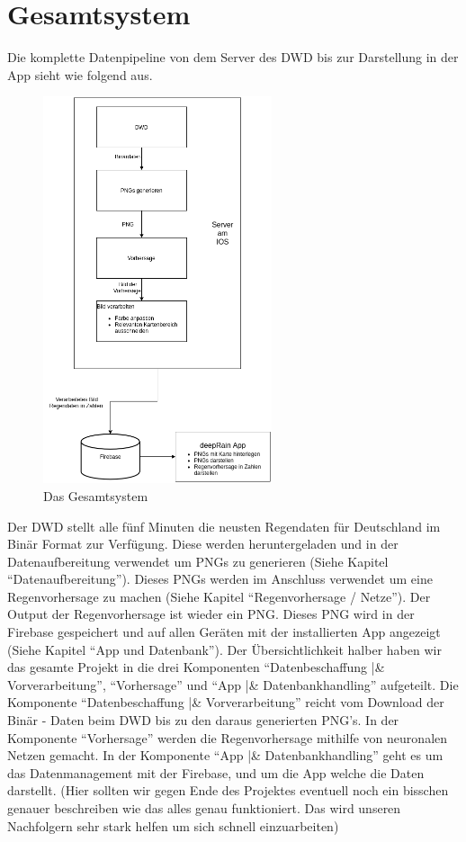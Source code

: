 \section{Gesamtsystem}\label{gesamtsystem}
Die komplette Datenpipeline von dem Server des DWD bis zur Darstellung in der App sieht wie folgend aus.  

\begin{figure}[htb]
 \centering
 \includegraphics[width=0.6\textwidth,angle=0]{abb/Gesamtsystem}
 \caption[Das Gesamtsystem]{Das Gesamtsystem}
\label{fig:Beschreibung}
\end{figure}

Der DWD stellt alle fünf Minuten die neusten Regendaten für Deutschland im Binär Format zur Verfügung. Diese werden heruntergeladen und in der Datenaufbereitung 
verwendet um PNGs zu generieren (Siehe Kapitel “Datenaufbereitung”). Dieses PNGs werden im Anschluss verwendet um eine Regenvorhersage zu machen 
(Siehe Kapitel “Regenvorhersage / Netze”). Der Output der Regenvorhersage ist wieder ein PNG. 
Dieses PNG wird in der Firebase gespeichert und auf allen Geräten mit der installierten App angezeigt (Siehe Kapitel “App und Datenbank”). 
Der Übersichtlichkeit halber haben wir das gesamte Projekt in die drei Komponenten “Datenbeschaffung |\& Vorverarbeitung”, “Vorhersage” und 
“App |\& Datenbankhandling” aufgeteilt.  
Die Komponente “Datenbeschaffung |\& Vorverarbeitung” reicht vom Download der Binär - Daten beim DWD bis zu den daraus generierten PNG’s. 
In der Komponente “Vorhersage” werden die Regenvorhersage mithilfe von neuronalen Netzen gemacht. In der Komponente “App |\& Datenbankhandling” 
geht es um das Datenmanagement mit der Firebase, und um die App welche die Daten darstellt.  
(Hier sollten wir gegen Ende des Projektes eventuell noch ein bisschen genauer beschreiben wie das alles genau funktioniert. 
Das wird unseren Nachfolgern sehr stark helfen um sich schnell einzuarbeiten)  
